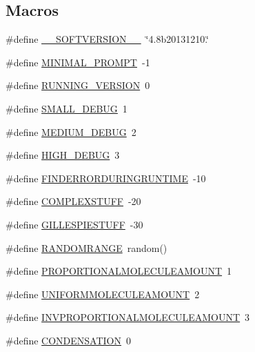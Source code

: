 \subsection*{Macros}
\begin{DoxyCompactItemize}
\item 
\#define \hyperlink{a00072_aab38659c2fe462437b89a1e85e619dc7}{\-\_\-\-\_\-\-S\-O\-F\-T\-V\-E\-R\-S\-I\-O\-N\-\_\-\-\_\-}~\char`\"{}4.\-8b20131210.\char`\"{}
\item 
\#define \hyperlink{a00072_a972f6696f10f8159f336357f003493b6}{M\-I\-N\-I\-M\-A\-L\-\_\-\-P\-R\-O\-M\-P\-T}~-\/1
\item 
\#define \hyperlink{a00072_a72244054b9e2e45fe85cbef84bd42904}{R\-U\-N\-N\-I\-N\-G\-\_\-\-V\-E\-R\-S\-I\-O\-N}~0
\item 
\#define \hyperlink{a00072_a6f7711b8195edb3c3541c153ebcb4bfa}{S\-M\-A\-L\-L\-\_\-\-D\-E\-B\-U\-G}~1
\item 
\#define \hyperlink{a00072_ab0ead5a0a8c59ad5f4d9fcf0be28a5d7}{M\-E\-D\-I\-U\-M\-\_\-\-D\-E\-B\-U\-G}~2
\item 
\#define \hyperlink{a00072_ac2a71f467524d5299cbff5df96be638a}{H\-I\-G\-H\-\_\-\-D\-E\-B\-U\-G}~3
\item 
\#define \hyperlink{a00072_a0934dca9b46dc1ce8ccae606a6511f63}{F\-I\-N\-D\-E\-R\-R\-O\-R\-D\-U\-R\-I\-N\-G\-R\-U\-N\-T\-I\-M\-E}~-\/10
\item 
\#define \hyperlink{a00072_a186bfb39322832c790ce5403bc04330d}{C\-O\-M\-P\-L\-E\-X\-S\-T\-U\-F\-F}~-\/20
\item 
\#define \hyperlink{a00072_a27f5d30679c0e8877ba9246eb1a48ff4}{G\-I\-L\-L\-E\-S\-P\-I\-E\-S\-T\-U\-F\-F}~-\/30
\item 
\#define \hyperlink{a00072_a4cb4f6978b0d938a0523bd6946e7609d}{R\-A\-N\-D\-O\-M\-R\-A\-N\-G\-E}~random()
\item 
\#define \hyperlink{a00072_a79c4b6317fd327fd5a62d65036481a25}{P\-R\-O\-P\-O\-R\-T\-I\-O\-N\-A\-L\-M\-O\-L\-E\-C\-U\-L\-E\-A\-M\-O\-U\-N\-T}~1
\item 
\#define \hyperlink{a00072_a6236cb136896f6bcbc6694d394e8aca3}{U\-N\-I\-F\-O\-R\-M\-M\-O\-L\-E\-C\-U\-L\-E\-A\-M\-O\-U\-N\-T}~2
\item 
\#define \hyperlink{a00072_ae36555e0be87892071c6340cc0fa43ad}{I\-N\-V\-P\-R\-O\-P\-O\-R\-T\-I\-O\-N\-A\-L\-M\-O\-L\-E\-C\-U\-L\-E\-A\-M\-O\-U\-N\-T}~3
\item 
\#define \hyperlink{a00072_aeeaf3e004dff03f70f94e0cf7d623b3c}{C\-O\-N\-D\-E\-N\-S\-A\-T\-I\-O\-N}~0
\item 

\end{DoxyCompactItemize}
